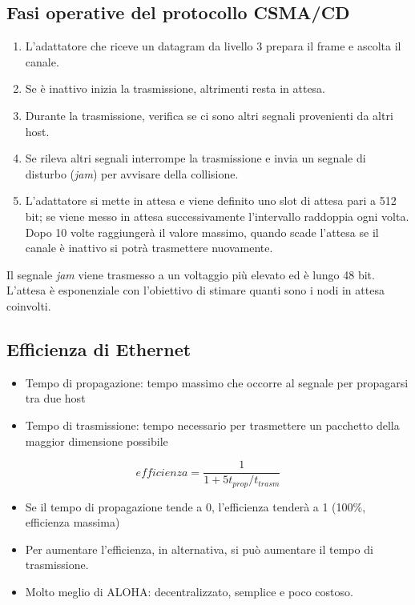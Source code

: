 \documentclass[
]{article}
\begin{document}
\hypertarget{header-n167}{%
\subsection{Fasi operative del protocollo CSMA/CD}\label{header-n167}}

\begin{enumerate}
\def\labelenumi{\arabic{enumi}.}
\item
  L'adattatore che riceve un datagram da livello 3 prepara il frame e
  ascolta il canale.
\item
  Se è inattivo inizia la trasmissione, altrimenti resta in attesa.
\item
  Durante la trasmissione, verifica se ci sono altri segnali provenienti
  da altri host.
\item
  Se rileva altri segnali interrompe la trasmissione e invia un segnale
  di disturbo (\emph{jam}) per avvisare della collisione.
\item
  L'adattatore si mette in attesa e viene definito uno slot di attesa
  pari a 512 bit; se viene messo in attesa successivamente l'intervallo
  raddoppia ogni volta. Dopo 10 volte raggiungerà il valore massimo,
  quando scade l'attesa se il canale è inattivo si potrà trasmettere
  nuovamente.
\end{enumerate}

Il segnale \emph{jam} viene trasmesso a un voltaggio più elevato ed è
lungo 48 bit. L'attesa è esponenziale con l'obiettivo di stimare quanti
sono i nodi in attesa coinvolti.

\hypertarget{header-n180}{%
\subsection{Efficienza di Ethernet}\label{header-n180}}

\begin{itemize}
\item
  Tempo di propagazione: tempo massimo che occorre al segnale per
  propagarsi tra due host
\item
  Tempo di trasmissione: tempo necessario per trasmettere un pacchetto
  della maggior dimensione possibile
\end{itemize}

\[efficienza = \frac{1}{1+5t_{prop}/t_{trasm}}\]

\begin{itemize}
\item
  Se il tempo di propagazione tende a 0, l'efficienza tenderà a 1
  (100\%, efficienza massima)
\item
  Per aumentare l'efficienza, in alternativa, si può aumentare il tempo
  di trasmissione.
\item
  Molto meglio di ALOHA: decentralizzato, semplice e poco costoso.
\end{itemize}
\end{document}
